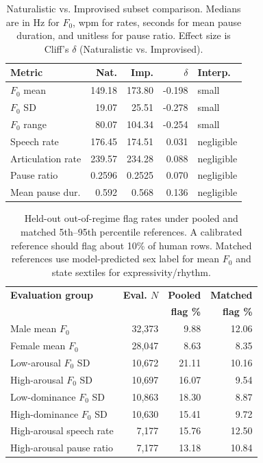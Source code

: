 \documentclass[conference]{IEEEtran}
\begin{document}
\begin{table}[t]
\centering
\caption{Naturalistic vs. Improvised subset comparison. Medians are in Hz for $F_0$, wpm for rates, seconds for mean pause duration, and unitless for pause ratio. Effect size is Cliff's $\delta$ (Naturalistic vs. Improvised).}
\label{tab:naturalistic_improvised}
\small
\setlength{\tabcolsep}{3pt}
\begin{tabular}{l r r r l}
\toprule
\textbf{Metric} & \textbf{Nat.} & \textbf{Imp.} & \textbf{$\delta$} & \textbf{Interp.} \\
\midrule
$F_0$ mean        & 149.18 & 173.80 & -0.198 & small \\
$F_0$ SD          & 19.07  & 25.51  & -0.278 & small \\
$F_0$ range       & 80.07  & 104.34 & -0.254 & small \\
Speech rate       & 176.45 & 174.51 & 0.031  & negligible \\
Articulation rate & 239.57 & 234.28 & 0.088  & negligible \\
Pause ratio       & 0.2596 & 0.2525 & 0.070  & negligible \\
Mean pause dur.   & 0.592  & 0.568  & 0.136  & negligible \\
\bottomrule
\end{tabular}
\end{table}

\begin{table}[t]
\centering
\caption{Held-out out-of-regime flag rates under pooled and matched 5th--95th percentile references. A calibrated reference should flag about 10\% of human rows. Matched references use model-predicted sex label for mean $F_0$ and state sextiles for expressivity/rhythm.}
\label{tab:pooled_matched_flags}
\small
\setlength{\tabcolsep}{3pt}
\begin{tabular}{l r r r}
\toprule
\textbf{Evaluation group} & \textbf{Eval. $N$} & \textbf{Pooled} & \textbf{Matched} \\
 & & \textbf{flag \%} & \textbf{flag \%} \\
\midrule
Male mean $F_0$         & 32{,}373 & 9.88  & 12.06 \\
Female mean $F_0$       & 28{,}047 & 8.63  & 8.35 \\
Low-arousal $F_0$ SD    & 10{,}672 & 21.11 & 10.16 \\
High-arousal $F_0$ SD   & 10{,}697 & 16.07 & 9.54 \\
Low-dominance $F_0$ SD  & 10{,}863 & 18.30 & 8.87 \\
High-dominance $F_0$ SD & 10{,}630 & 15.41 & 9.72 \\
High-arousal speech rate & 7{,}177  & 15.76 & 12.50 \\
High-arousal pause ratio & 7{,}177  & 13.18 & 10.84 \\
\bottomrule
\end{tabular}
\end{table}
\end{document}
